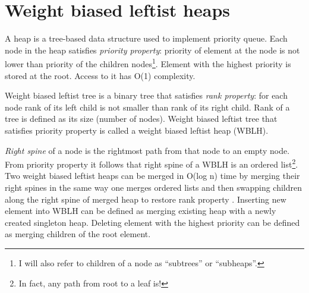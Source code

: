 \section{Weight biased leftist heaps}\label{sec:wblh}

A heap is a tree-based data structure used to implement priority queue. Each node in the heap satisfies \textit{priority property}: priority of element at the node is not lower than priority of the children nodes\footnote{I will also refer to children of a node as ``subtrees'' or ``subheaps''.}. Element with the highest priority is stored at the root. Access to it has O(1) complexity.

Weight biased leftist tree \cite{ChoSah96} is a binary tree that satisfies \textit{rank property}: for each node rank of its left child is not smaller than rank of its right child. Rank of a tree is defined as its size (number of nodes). Weight biased leftist tree that satisfies priority property is called a weight biased leftist heap (WBLH).

\textit{Right spine} of a node is the rightmost path from that node to an empty node. From priority property it follows that right spine of a WBLH is an ordered list\footnote{In fact, any path from root to a leaf is!}. Two weight biased leftist heaps can be merged in O(log n) time by merging their right spines in the same way one merges ordered lists and then swapping children along the right spine of merged heap to restore rank property \cite{Oka99}. Inserting new element into WBLH can be defined as merging existing heap with a newly created singleton heap. Deleting element with the highest priority can be defined as merging children of the root element.
